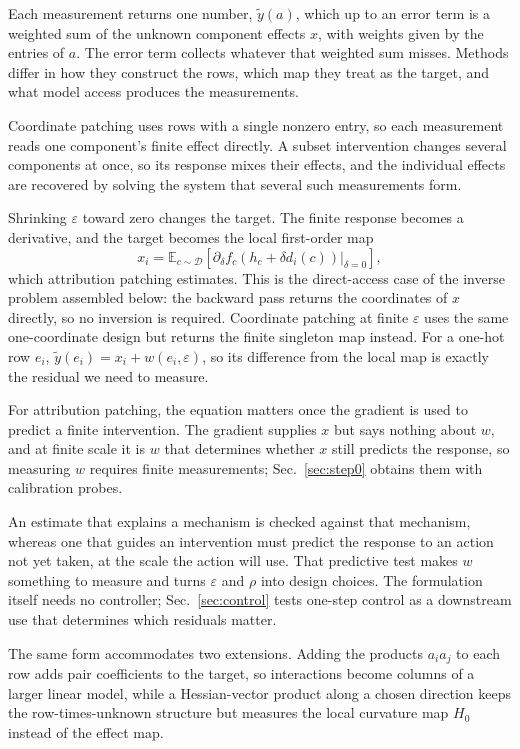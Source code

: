 \documentclass[sigconf,10pt,nonacm,balance=false]{acmart}
\newcommand{\eps}{\varepsilon}
\newcommand{\E}{\mathbb{E}}
\begin{document}
Each measurement returns one number, $\widetilde y(a)$, which up to an error term is a weighted sum of the unknown component effects $x$, with weights given by the entries of $a$. The error term collects whatever that weighted sum misses. Methods differ in how they construct the rows, which map they treat as the target, and what model access produces the measurements.

Coordinate patching uses rows with a single nonzero entry, so each measurement reads one component's finite effect directly. A subset intervention changes several components at once, so its response mixes their effects, and the individual effects are recovered by solving the system that several such measurements form.

Shrinking $\eps$ toward zero changes the target. The finite response becomes a derivative, and the target becomes the local first-order map
\begin{equation}
    x_i = \E_{c\sim\mathcal{D}}\left[\left.\partial_\delta f_c(h_c+\delta d_i(c))\right|_{\delta=0}\right],
    \label{eq:firstorder}
\end{equation}
which attribution patching estimates. This is the direct-access case of the inverse problem assembled below: the backward pass returns the coordinates of $x$ directly, so no inversion is required. Coordinate patching at finite $\eps$ uses the same one-coordinate design but returns the finite singleton map instead. For a one-hot row $e_i$, $\widetilde y(e_i)=x_i+w(e_i,\eps)$, so its difference from the local map is exactly the residual we need to measure.

For attribution patching, the equation matters once the gradient is used to predict a finite intervention. The gradient supplies $x$ but says nothing about $w$, and at finite scale it is $w$ that determines whether $x$ still predicts the response, so measuring $w$ requires finite measurements; Sec.~\ref{sec:step0} obtains them with calibration probes.

An estimate that explains a mechanism is checked against that mechanism, whereas one that guides an intervention must predict the response to an action not yet taken, at the scale the action will use. That predictive test makes $w$ something to measure and turns $\eps$ and $\rho$ into design choices. The formulation itself needs no controller; Sec.~\ref{sec:control} tests one-step control as a downstream use that determines which residuals matter.

The same form accommodates two extensions. Adding the products $a_i a_j$ to each row adds pair coefficients to the target, so interactions become columns of a larger linear model, while a Hessian-vector product along a chosen direction keeps the row-times-unknown structure but measures the local curvature map $H_0$ instead of the effect map.
\end{document}
